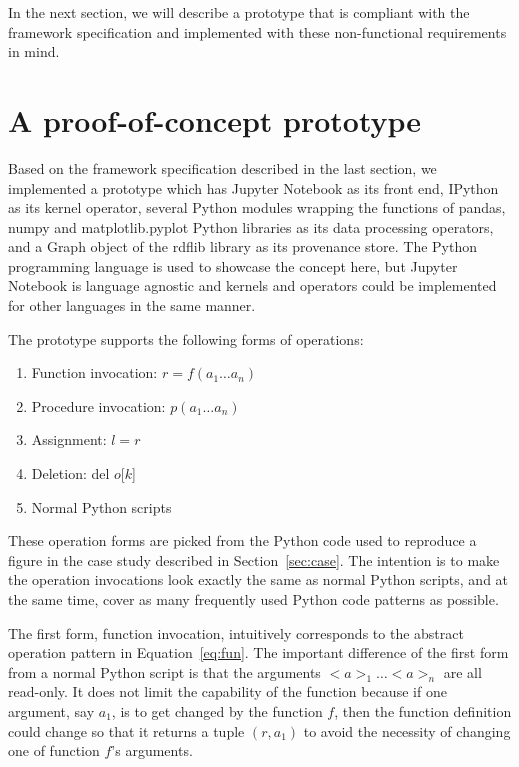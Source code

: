 In the next section, we will describe a prototype that is compliant with the framework specification and implemented with these non-functional requirements in mind.



\section{A proof-of-concept prototype}
\label{sec:prototype}
Based on the framework specification described in the last section, we implemented a prototype which has Jupyter Notebook as its front end, IPython as its kernel operator, several Python modules wrapping the functions of pandas, numpy and matplotlib.pyplot Python libraries as its data processing operators, and a Graph object of the rdflib library as its provenance store. The Python programming language is used to showcase the concept here, but Jupyter Notebook is language agnostic and kernels and operators could be implemented for other languages in the same manner.

The prototype supports the following forms of operations:
\begin{enumerate}
	\item Function invocation: $r = f(a_1\dots a_n)$
	\item Procedure invocation: $p(a_1\dots a_n)$
	\item Assignment: $l = r$
	\item Deletion: del $o$[$k$]
	\item Normal Python scripts
\end{enumerate}
These operation forms are picked from the Python code used to reproduce a figure in the case study described in Section~\ref{sec:case}. The intention is to make the operation invocations look exactly the same as normal Python scripts, and at the same time, cover as many frequently used Python code patterns as possible.

The first form, function invocation, intuitively corresponds to the abstract operation pattern in Equation~\ref{eq:fun}. The important difference of the first form from a normal Python script is that the arguments $<a>_1\dots<a>_n$ are all read-only. It does not limit the capability of the function because if one argument, say $a_1$, is to get changed by the function $f$, then the function definition could change so that it returns a tuple $(r, a_1)$ to avoid the necessity of changing one of function $f$'s arguments.

